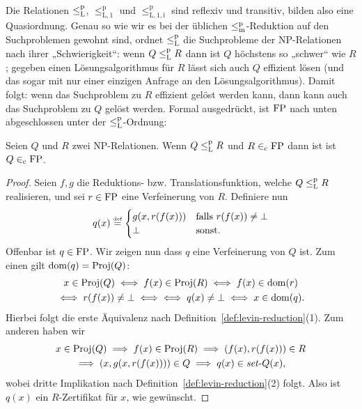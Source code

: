Die Relationen $\leq_\mathrm{L}^\mathrm{p}$, $\leq_\mathrm{L,1}^\mathrm p$ und $\leq_\mathrm{L,1,i}^\mathrm p$ sind reflexiv und transitiv, bilden also eine Quasiordnung.
% 
Genau so wie wir es bei der üblichen $\leq_\mathrm{m}^\mathrm{p}$-Reduktion auf den Suchproblemen gewohnt sind, ordnet $\leq_\mathrm{L}^\mathrm{p}$ die Suchprobleme der NP-Relationen nach ihrer „Schwierigkeit“: wenn $Q\leq_\mathrm{L}^\mathrm{p} R$ dann ist $Q$ höchstens so „schwer“ wie $R$; gegeben einen Lösungsalgorithmus für $R$ lässt sich auch $Q$ effizient lösen (und das sogar mit nur einer einzigen Anfrage an den Lösungsalgorithmus). Damit folgt: wenn das Suchproblem zu $R$ effizient gelöst werden kann, dann kann auch das Suchproblem zu $Q$ gelöst werden. 
Formal ausgedrückt, ist $\mathrm{FP}$ nach unten abgeschlossen unter der $\leq_\mathrm{L}^\mathrm{p}$-Ordnung:

\begin{lemma}
    Seien $Q$ und $R$ zwei NP-Relationen.
    Wenn $Q\leq_\mathrm{L}^\mathrm{p} R$ und $R\in_\mathrm{c}\mathrm{FP}$ dann ist ist $Q\in_\mathrm{c} \mathrm{FP}$.
\end{lemma}
\begin{proof}
    Seien $f,g$ die Reduktions- bzw. Translationsfunktion, welche $Q\leq_\mathrm{L}^\mathrm{p} R$ realisieren, und sei $r\in\mathrm{FP}$ eine Verfeinerung von $R$.
    Definiere nun
    \[ q(x) \stackrel{\text{{\normalfont\tiny def}}}{=} \begin{cases} g(x, r(f(x))) & \text{falls $r(f(x))\neq \bot$} \\ \bot & \text{sonst}.\end{cases} \]
    Offenbar ist $q\in\mathrm{FP}$. Wir zeigen nun dass $q$ eine Verfeinerung von $Q$ ist.
    Zum einen gilt $\operatorname{dom}(q)=\operatorname{Proj}(Q)$:
    \begin{gather*} x\in\operatorname{Proj}(Q) \iff f(x)\in\operatorname{Proj}(R) \iff f(x)\in\operatorname{dom}(r) \\
    \iff r(f(x))\neq\bot \iff \iff q(x)\neq\bot \iff x\in\operatorname{dom}(q). \end{gather*}
    Hierbei folgt die erste Äquivalenz nach Definition~\ref{def:levin-reduction}(1).
    Zum anderen haben wir
    \begin{gather*}
        x\in\operatorname{Proj}(Q) \implies f(x)\in\operatorname{Proj}(R) \implies (f(x), r(f(x)))\in R\\ \implies (x, g(x, r(f(x))))\in Q \implies q(x)\in\mathit{set}\text{-}{}Q(x),
    \end{gather*}
    wobei dritte Implikation nach Definition~\ref{def:levin-reduction}(2) folgt. Also ist $q(x)$ ein $R$-Zertifikat für $x$, wie gewünscht.
\end{proof}


